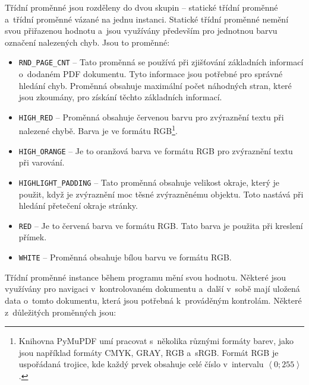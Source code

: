 Třídní proměnné jsou rozděleny do dvou skupin -- statické třídní proměnné
a~třídní proměnné vázané na jednu instanci. Statické třídní proměnné nemění 
svou přiřazenou hodnotu a~jsou využívány především pro jednotnou barvu označení
nalezených chyb. Jsou to proměnné:
\begin{itemize}
    \item \texttt{RND\_PAGE\_CNT} -- Tato proměnná se používá při zjišťování
    základních informací o~dodaném PDF dokumentu. Tyto informace jsou potřebné
    pro správné hledání chyb. Proměnná obsahuje maximální počet náhodných stran,
    které jsou zkoumány, pro získání těchto základních informací.

    \item \texttt{HIGH\_RED} -- Proměnná obsahuje červenou barvu pro zvýraznění
    textu při nalezené chybě. Barva je ve formátu RGB\footnote{
        Knihovna PyMuPDF umí pracovat s~několika různými formáty barev, jako
        jsou například formáty CMYK, GRAY, RGB a~sRGB. 
        Formát RGB je uspořádaná trojice, kde každý prvek obsahuje celé číslo
        v~intervalu $\left\langle 0;255 \right\rangle$.
    }.

    \item \texttt{HIGH\_ORANGE} -- Je to oranžová barva ve formátu RGB pro
    zvýraznění textu při varování.
    
    \item \texttt{HIGHLIGHT\_PADDING} -- Tato proměnná obsahuje velikost okraje,
    který je použit, když je zvýraznění moc těsné zvýrazněnému objektu. Toto
    nastává při hledání přetečení okraje stránky.
    
    \item \texttt{RED} -- Je to červená barva ve formátu RGB. Tato barva je
    použita při kreslení přímek.
    
    \item \texttt{WHITE} -- Proměnná obsahuje bílou barvu ve formátu RGB.
\end{itemize}
Třídní proměnné instance během programu mění svou hodnotu. Některé jsou využívány
pro navigaci v~kontrolovaném dokumentu a~další v~sobě mají uložená data
o~tomto dokumentu, která jsou potřebná k~prováděným kontrolám. Některé z~důležitých
proměnných jsou:
